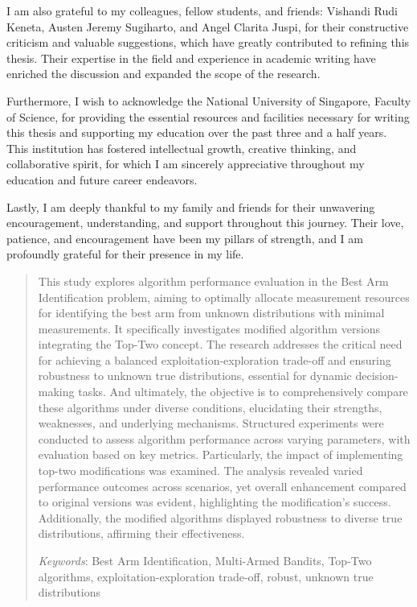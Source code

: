 \documentclass[a4paper, 12pt]{article}
\theoremstyle{definition}
\begin{document}
I am also grateful to my colleagues, fellow students, and friends: Vishandi Rudi Keneta, Austen Jeremy Sugiharto, and Angel Clarita Juspi, for their constructive criticism and valuable suggestions, which have greatly contributed to refining this thesis. Their expertise in the field and experience in academic writing have enriched the discussion and expanded the scope of the research.

Furthermore, I wish to acknowledge the National University of Singapore, Faculty of Science, for providing the essential resources and facilities necessary for writing this thesis and supporting my education over the past three and a half years. This institution has fostered intellectual growth, creative thinking, and collaborative spirit, for which I am sincerely appreciative throughout my education and future career endeavors.

Lastly, I am deeply thankful to my family and friends for their unwavering encouragement, understanding, and support throughout this journey. Their love, patience, and encouragement have been my pillars of strength, and I am profoundly grateful for their presence in my life.



\newpage
\begin{abstract}
This study explores algorithm performance evaluation in the Best Arm Identification problem, aiming to optimally allocate measurement resources for identifying the best arm from unknown distributions with minimal measurements. It specifically investigates modified algorithm versions integrating the Top-Two concept. The research addresses the critical need for achieving a balanced exploitation-exploration trade-off and ensuring robustness to unknown true distributions, essential for dynamic decision-making tasks. And ultimately, the objective is to comprehensively compare these algorithms under diverse conditions, elucidating their strengths, weaknesses, and underlying mechanisms. Structured experiments were conducted to assess algorithm performance across varying parameters, with evaluation based on key metrics. Particularly, the impact of implementing top-two modifications was examined. The analysis revealed varied performance outcomes across scenarios, yet overall enhancement compared to original versions was evident, highlighting the modification's success. Additionally, the modified algorithms displayed robustness to diverse true distributions, affirming their effectiveness.

\textit{Keywords}: Best Arm Identification, Multi-Armed Bandits, Top-Two algorithms, exploitation-exploration trade-off, robust, unknown true distributions
\end{abstract}
\end{document}
